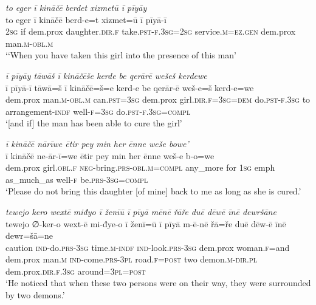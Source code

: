 \ea \label{ZP.44}
\textit{to eger ī kināčē berdet xizmetū ī pīyāy} \\ 
\gll to eger ī kināčē berd-e=t xizmet=ū ī pīyā-ī \\ 
 \textsc{2sg} if dem.prox daughter\textsc{.dir}\textsc{.f} take\textsc{.pst}\textsc{-f}\textsc{.3sg}\textsc{=\textsc{2sg}} service\textsc{.m}\textsc{\textsc{=ez.gen}} dem.prox man\textsc{.m}\textsc{-obl}\textsc{.m} \\ 
\glt `‘When you have taken this girl into the presence of this man'
\z 
 
\ea \label{ZP.45}
\textit{ī pīyāy tāwāš ī kināčēše kerde be qerārē wešeš kerdewe} \\ 
\gll ī pīyā-ī tāwā=š ī kināčē=š=e kerd-e be qerār-ē weš-e=š kerd-e=we \\ 
 dem.prox man\textsc{.m}\textsc{-obl}\textsc{.m} can\textsc{.pst}\textsc{=3sg} dem.prox girl\textsc{.dir}\textsc{.f}\textsc{=3sg}\textsc{=dem} do\textsc{.pst}\textsc{-f}\textsc{.3sg} to arrangement\textsc{-indf} well\textsc{-f}\textsc{=3sg} do\textsc{.pst}\textsc{-f}\textsc{.3sg}\textsc{=compl} \\ 
\glt `[and if] the man has been able to cure the girl'
\z 
 
\ea \label{ZP.48}
\textit{ī kināčē nārīwe ētir pey min her ēnne weše bowe’} \\ 
\gll ī kināčē ne-ār-ī=we ētir pey min her ēnne weš-e b-o=we \\ 
 dem.prox girl\textsc{.obl}\textsc{.f} \textsc{neg-}bring\textsc{.prs}\textsc{-obl}\textsc{.m}\textsc{=compl} any\_more for \textsc{1sg} emph as\_much\_as well\textsc{-f} be\textsc{.prs}\textsc{-3sg}\textsc{=compl} \\ 
\glt `Please do not bring this daughter [of mine] back to me as long as she is cured.'
\z 
 
\ea \label{ZP.67}
\textit{tewejo kero wextē miđyo ī ženīū ī pīyā mēnē řāře duē dēwē īnē dewršāne} \\ 
\gll tewejo ∅-ker-o wext-ē mi-đye-o ī ženī=ū ī pīyā m-ē-nē řā=ře duē dēw-ē īnē dewr=šā=ne \\ 
 caution \textsc{ind-}do\textsc{.prs}\textsc{-3sg} time\textsc{.m}\textsc{-indf} \textsc{ind-}look\textsc{.prs}\textsc{-3sg} dem.prox woman\textsc{.f}=and dem.prox man\textsc{.m} \textsc{ind-}come\textsc{.prs}\textsc{-3pl} road\textsc{.f}\textsc{=\textsc{post}} two demon\textsc{.m}\textsc{-dir}\textsc{.pl} dem.prox\textsc{.dir}\textsc{.f}\textsc{.3sg} around\textsc{=3pl}\textsc{=\textsc{post}} \\ 
\glt `He noticed that when these two persons were on their way, they were surrounded by two demons.'
\z 
 

